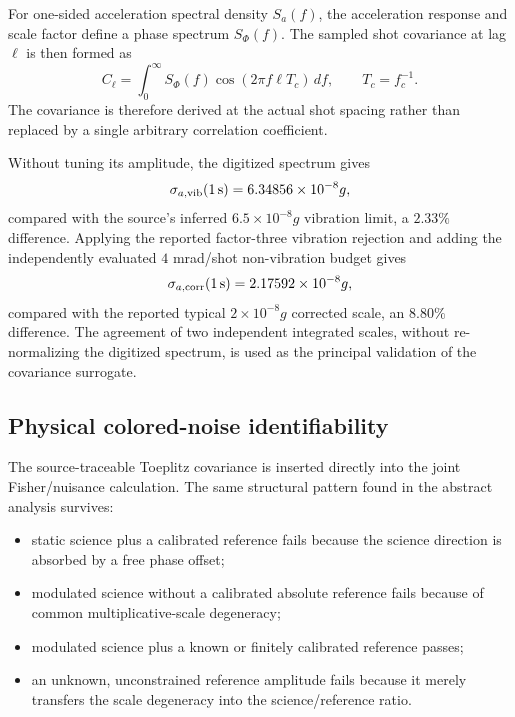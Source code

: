 For one-sided acceleration spectral density $S_a(f)$, the acceleration response and scale factor define a phase spectrum $S_\Phi(f)$. The sampled shot covariance at lag $\ell$ is then formed as
\begin{equation}
C_\ell=\int_0^{\infty}S_\Phi(f)
\cos(2\pi f\ell T_c)\,df,
\qquad T_c=f_c^{-1}.
\label{eq:covariance}
\end{equation}
The covariance is therefore derived at the actual shot spacing rather than replaced by a single arbitrary correlation coefficient.

Without tuning its amplitude, the digitized spectrum gives
\begin{equation}
\sigma_{a,\rm vib}(1\,{\rm s})=6.34856\times10^{-8}g,
\end{equation}
compared with the source's inferred $6.5\times10^{-8}g$ vibration limit, a $2.33\%$ difference. Applying the reported factor-three vibration rejection and adding the independently evaluated $4$ mrad/shot non-vibration budget gives
\begin{equation}
\sigma_{a,\rm corr}(1\,{\rm s})=2.17592\times10^{-8}g,
\end{equation}
compared with the reported typical $2\times10^{-8}g$ corrected scale, an $8.80\%$ difference. The agreement of two independent integrated scales, without re-normalizing the digitized spectrum, is used as the principal validation of the covariance surrogate.

\subsection{Physical colored-noise identifiability}

The source-traceable Toeplitz covariance is inserted directly into the joint Fisher/nuisance calculation. The same structural pattern found in the abstract analysis survives:
\begin{itemize}
\item static science plus a calibrated reference fails because the science direction is absorbed by a free phase offset;
\item modulated science without a calibrated absolute reference fails because of common multiplicative-scale degeneracy;
\item modulated science plus a known or finitely calibrated reference passes;
\item an unknown, unconstrained reference amplitude fails because it merely transfers the scale degeneracy into the science/reference ratio.
\end{itemize}

